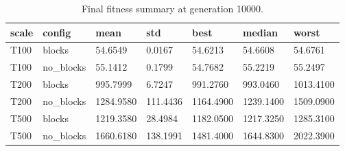 \begin{table}[htbp]
\centering
\caption{Final fitness summary at generation 10000.}
\label{tab:final_fitness_summary}
\begin{tabular}{lllllll}
\toprule
scale & config & mean & std & best & median & worst \\
\midrule
T100 & blocks & 54.6549 & 0.0167 & 54.6213 & 54.6608 & 54.6761 \\
T100 & no_blocks & 55.1412 & 0.1799 & 54.7682 & 55.2219 & 55.2497 \\
T200 & blocks & 995.7999 & 6.7247 & 991.2760 & 993.0460 & 1013.4100 \\
T200 & no_blocks & 1284.9580 & 111.4436 & 1164.4900 & 1239.1400 & 1509.0900 \\
T500 & blocks & 1219.3580 & 28.4984 & 1182.0500 & 1217.3250 & 1285.3100 \\
T500 & no_blocks & 1660.6180 & 138.1991 & 1481.4000 & 1644.8300 & 2022.3900 \\
\bottomrule
\end{tabular}
\end{table}
